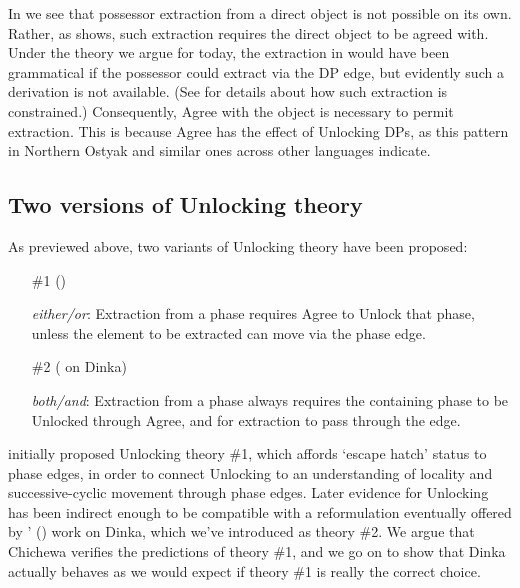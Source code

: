 \documentclass[output=paper,colorlinks,citecolor=brown]{langscibook}
\begin{document}
In  we see that possessor extraction from a direct object is not possible on its own. Rather, as  shows, such extraction requires the direct object to be agreed with. Under the theory we argue for today, the extraction in  would have been grammatical if the possessor could extract via the DP edge, but evidently such a derivation is not available. (See \citealt{Branan2018} for details about how such extraction is constrained.) Consequently, Agree with the object is necessary to permit extraction. This is because Agree has the effect of Unlocking DPs, as this pattern in Northern Ostyak and similar ones across other languages indicate.

\subsection{Two versions of Unlocking theory}\label{sec:branan:2.3}

As previewed above, two variants of Unlocking theory have been proposed:

\begin{itemize}
	\item[\#1] (\citealt{RackowskiRichards2005, Halpert2016, Halpert2019, Branan2018})

    \textit{either/or}: Extraction from a phase requires Agree to Unlock that phase, unless the element to be extracted can move via the phase edge.

    \item[\#2] (\citealt{VanUrkRichards2015} on Dinka)

     \textit{both/and}: Extraction from a phase always requires the containing phase to be Unlocked through Agree, and for extraction to pass through the edge.
\end{itemize}

\citeauthor{RackowskiRichards2005} initially proposed Unlocking theory \#1, which affords `escape hatch' status to phase edges, in order to connect Unlocking to an understanding of locality and successive-cyclic movement through phase edges. Later evidence for Unlocking has been indirect enough to be compatible with a reformulation eventually offered by \citeauthor{VanUrkRichards2015}' (\citeyear{VanUrkRichards2015}) work on Dinka, which we've introduced as theory \#2. We argue that Chichewa verifies the predictions of theory $\#$1, and we go on to show that Dinka actually behaves as we would expect if theory \#1 is really the correct choice.
\end{document}
